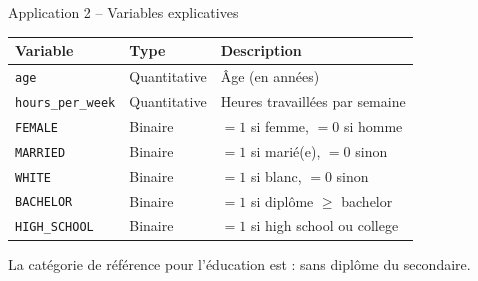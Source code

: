 \documentclass[11pt,aspectratio=169]{beamer}
\begin{document}
\begin{frame}{Application 2 -- Variables explicatives}

\begin{center}
    \small
    \renewcommand{\arraystretch}{1.2}
    \begin{tabular}{llp{6cm}}
        \toprule
        \textbf{Variable} & \textbf{Type} & \textbf{Description} \\
        \midrule
        \texttt{age} & Quantitative & Âge (en années) \\
        \texttt{hours\_per\_week} & Quantitative & Heures travaillées par
          semaine \\
        \texttt{FEMALE} & Binaire & $=1$ si femme, $=0$ si homme \\
        \texttt{MARRIED} & Binaire & $=1$ si marié(e), $=0$ sinon \\
        \texttt{WHITE} & Binaire & $=1$ si blanc, $=0$ sinon \\
        \texttt{BACHELOR} & Binaire & $=1$ si diplôme $\geq$ bachelor \\
        \texttt{HIGH\_SCHOOL} & Binaire & $=1$ si high school ou college \\
        \bottomrule
    \end{tabular}
\end{center}

La catégorie de référence pour l'éducation est : sans diplôme du
secondaire.

\end{frame}
\end{document}
